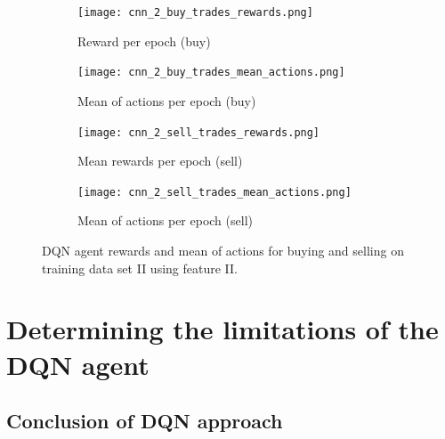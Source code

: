 \begin{figure}[H]
    \centering
    \begin{subfigure}[b]{0.45\textwidth}
        \texttt{[image: cnn\_2\_buy\_trades\_rewards.png]}
        \caption{Reward per epoch (buy)}
        \label{fig:analysis-dqn-1-trades-reward-buy}
    \end{subfigure}
    \begin{subfigure}[b]{0.45\textwidth}
        \texttt{[image: cnn\_2\_buy\_trades\_mean\_actions.png]}
        \caption{Mean of actions per epoch (buy)}
        \label{fig:analysis-dqn-1-trades-action-buy}
    \end{subfigure}
    \begin{subfigure}[b]{0.45\textwidth}
        \texttt{[image: cnn\_2\_sell\_trades\_rewards.png]}
        \caption{Mean rewards per epoch (sell)}
        \label{fig:analysis-dqn-1-trades-reward-sell}
    \end{subfigure}
    \begin{subfigure}[b]{0.45\textwidth}
        \texttt{[image: cnn\_2\_sell\_trades\_mean\_actions.png]}
        \caption{Mean of actions per epoch (sell)}
        \label{fig:analysis-dqn-1-trades-action-sell}
    \end{subfigure}
    \caption{DQN agent rewards and mean of actions for buying and selling on training data set II using feature II.}
    \label{fig:analysis-dqn-2}
\end{figure}

\section{Determining the limitations of the DQN agent}
\label{sec:eval-dqn-limitations}

\subsection{Conclusion of DQN approach}
